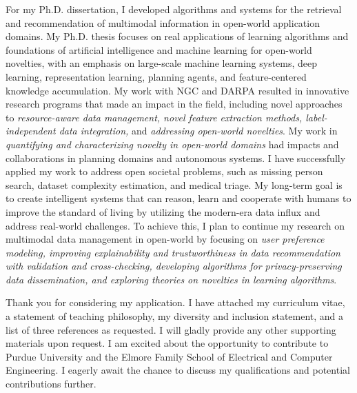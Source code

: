 \documentclass[10pt]{article}
\renewcommand*\paragraph[1]{}
\begin{document}
\paragraph{1 and P1) Earned doctoral degree in computer science or a closely related field}
For my Ph.D. dissertation, I developed algorithms and systems for the retrieval and recommendation of multimodal information in open-world application domains. My Ph.D. thesis focuses on real applications of learning algorithms and foundations of artificial intelligence and machine learning for open-world novelties, with an emphasis on large-scale machine learning systems, deep learning, representation learning, planning agents, and feature-centered knowledge accumulation. My work with NGC and DARPA resulted in innovative research programs that made an impact in the field, including novel approaches to \textit{resource-aware data management, novel feature extraction methods, label-independent data integration,} and \textit{addressing open-world novelties}. My work in \textit{quantifying and characterizing novelty in open-world domains} had impacts and collaborations in planning domains and autonomous systems. I have successfully applied my work to address open societal problems, such as missing person search, dataset complexity estimation, and medical triage.
%
My long-term goal is to create intelligent systems that can reason, learn and cooperate with humans to improve the standard of living by utilizing the 
modern-era data influx
and address real-world challenges.
To achieve this, I plan to continue my research on multimodal data management in open-world by focusing on \textit{user preference modeling, improving explainability and trustworthiness in data recommendation with validation and cross-checking, developing algorithms for privacy-preserving data dissemination, and exploring theories on novelties in learning algorithms}. 
%


Thank you for considering my application. 
I have attached my curriculum vitae, a statement of teaching philosophy, my diversity and inclusion statement, and a list of three references as requested. I will gladly provide any other supporting materials upon request.
I am excited about the opportunity to contribute to Purdue University and the Elmore Family School of Electrical and Computer Engineering. I eagerly await the chance to discuss my qualifications and potential contributions further.
\end{document}
